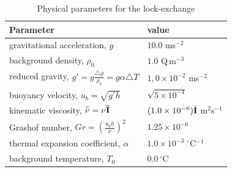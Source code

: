 \begin{table}[th]
\centering
\begin{tabular}[h]{ll}  \hline
Parameter                                                                     & value \\ \hline
gravitational acceleration, $g$                                               & $10.0$ ms$^{-2}$ \\
background density, $\rho_0$                                                  & $1.0$ Q$\,$m$^{-3}$ \\
reduced gravity, $g' = g\frac{\triangle \rho}{\rho_0} = g\alpha \triangle T $ & $1,0 \times 10^{-2}$ ms$^{-2}$ \\
buoyancy velocity, $u_b = \sqrt{g'h}$                                         & $\sqrt{5 \times 10^{-4}}$ \\
kinematic viscosity, $\bar{\bar{\bf \nu}} = \nu\bar{\bf I}$                   & $(1.0 \times 10^{-6})\bar{\bf I}$ m$^2$s$^{-1}$ \\
Grashof number, $Gr = \left( \frac{u_bh}{\nu} \right)^2$                      & $1.25 \times 10^{-6}$\\
thermal expansion coefficient, $\alpha$                                       & $1.0 \times 10^{-3} \;^\circ$C$^{-1}$ \\
background temperature, $T_0$                                                 & $0.0\,^{\circ}$C \\ \hline
\end{tabular}
\caption{Physical parameters for the lock-exchange}
\label{tab:le_physical_parameters}
\end{table}

